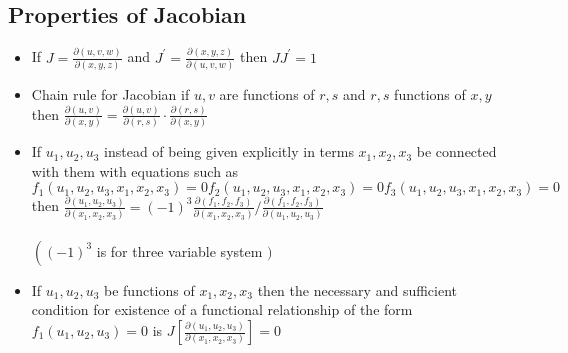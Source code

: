 \subsection{Properties of Jacobian}
\begin{itemize}
	\item  If $J=\frac{\partial(u, v, w)}{\partial(x, y, z)}$ and $J^{\prime}=\frac{\partial(x, y, z)}{\partial(u, v, w)}$ then $J J^{\prime}=1$
	\item Chain rule for Jacobian if $u, v$ are functions of $r, s$ and $r, s$ functions of $x, y$ then $\frac{\partial(u, v)}{\partial(x, y)}=\frac{\partial(u, v)}{\partial(r, s)} \cdot \frac{\partial(r, s)}{\partial(x, y)}$
	\item If $u_{1}, u_{2}, u_{3}$ instead of being given explicitly in terms $x_{1}, x_{2}, x_{3}$ be connected with them with equations such as
	$$
	f_{1}\left(u_{1}, u_{2}, u_{3}, x_{1}, x_{2}, x_{3}\right)=0 f_{2}\left(u_{1}, u_{2}, u_{3}, x_{1}, x_{2}, x_{3}\right)=0 f_{3}\left(u_{1}, u_{2}, u_{3}, x_{1}, x_{2}, x_{3}\right)=0
	$$
	then $\frac{\partial\left(u_{1}, u_{2}, u_{3}\right)}{\partial\left(x_{1}, x_{2}, x_{3}\right)}=(-1)^{3} \frac{\partial\left(f_{1}, f_{2}, f_{3}\right)}{\partial\left(x_{1}, x_{2}, x_{3}\right)} / \frac{\partial\left(f_{1}, f_{2}, f_{3}\right)}{\partial\left(u_{1}, u_{2}, u_{3}\right)}$
	\\\\$\left((-1)^{3}\right.$ is for three variable system $)$
	\item  If $u_{1}, u_{2}, u_{3}$ be functions of $x_{1}, x_{2}, x_{3}$ then the necessary and sufficient condition for existence of a functional relationship of the form $f_{1}\left(u_{1}, u_{2}, u_{3}\right)=0$ is $J\left[\frac{\partial\left(u_{1}, u_{2}, u_{3}\right)}{\partial\left(x_{1}, x_{2}, x_{3}\right)}\right]=0$
\end{itemize}

